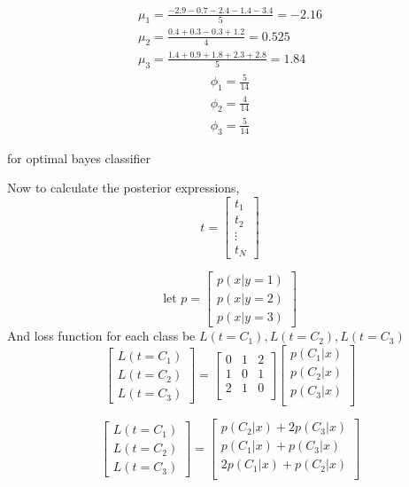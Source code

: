 \documentclass[solution,addpoints,12pt]{exam}
\begin{document}
\begin{questions}
\begin{parts}
\begin{solution}
\begin{align*}
  \mu_1 = \frac{-2.9 -0.7 -2.4 -1.4-3.4}{5} = -2.16 \\ 
  \mu_2 = \frac{0.4+0.3-0.3+1.2}{4} = 0.525 \\ 
  \mu_3 = \frac{1.4+0.9+1.8+2.3+2.8}{5} = 1.84 
\end{align*}
\begin{align*}
  \phi_1 = \frac{5}{14} \\ 
  \phi_2 = \frac{4}{14} \\ 
  \phi_3 = \frac{5}{14}
\end{align*}

for optimal bayes classifier 

Now to calculate the posterior expressions, 
\[
  t = \begin{bmatrix}
    t_1 \\ 
    t_2 \\ 
    \vdots \\ 
    t_N 
    \end{bmatrix} 
\]

\[
\text{let }p = \begin{bmatrix}
  p(x|y=1) \\ 
  p(x|y=2) \\ 
  p(x|y=3)
\end{bmatrix}
\]
And loss function for each class be  $L(t = C_1), L(t = C_2), L(t = C_3)$ 
\[
\begin{bmatrix}
  L(t=C_1) \\ 
  L(t=C_2) \\ 
  L(t=C_3)
\end{bmatrix}
= 
\begin{bmatrix}
  0&1&2 \\ 
  1&0&1 \\ 
  2&1&0 \\ 
\end{bmatrix}
\begin{bmatrix}
  p(C_1|x)\\
  p(C_2|x)\\ 
  p(C_3|x)\\ 
\end{bmatrix}
\]  

\[
\begin{bmatrix}
  L(t=C_1) \\ 
  L(t=C_2) \\ 
  L(t=C_3)
\end{bmatrix}
= 
\begin{bmatrix}
  p(C_2|x) +2p(C_3|x) \\
  p(C_1|x) + p(C_3|x)\\ 
  2p(C_1|x) + p(C_2|x)\\ 
\end{bmatrix}
\]  


\end{solution}
\end{parts}
\end{questions}
\end{document}
